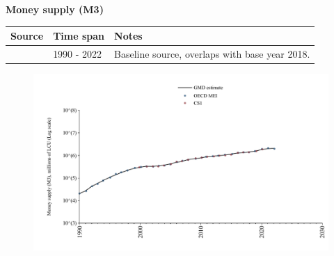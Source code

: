 \documentclass[12pt,a4paper,landscape]{article}
\begin{document}
\begin{adjustbox}{max totalsize={\paperwidth}{\paperheight},center}
\begin{minipage}[t][\textheight][t]{\textwidth}
\vspace*{0.5cm}
{}
\begin{center}
{\Large\bfseries Money supply (M3)}
\end{center}
\vspace{0.5cm}
\begin{table}[H]
\centering
\small
\begin{tabular}{|l|l|l|}
\hline
\textbf{Source} & \textbf{Time span} & \textbf{Notes} \\
\hline
\rowcolor{white}\cite{OECD_MEI}& 1990 - 2022 &Baseline source, overlaps with base year 2018. \\
\hline
\end{tabular}
\end{table}
\begin{figure}[H]
\centering
\includegraphics[width=\textwidth,height=0.6\textheight,keepaspectratio]{graphs/POL_M3.pdf}
\end{figure}
\end{minipage}
\end{adjustbox}
\end{document}
